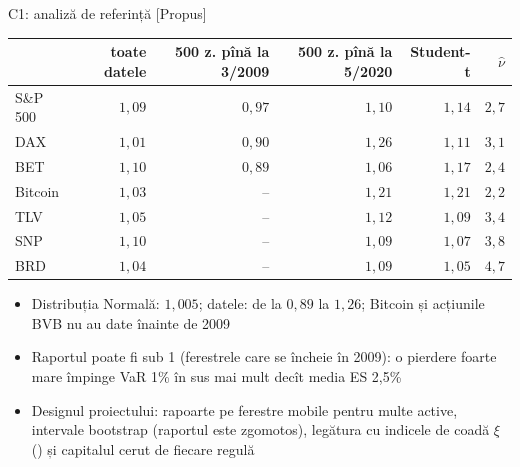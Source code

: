 \ifsolutions
\begin{frame}{C1: analiză de referință [Propus]}
\itemsize{\footnotesize}
\begin{center}
\scriptsize
\begin{tabular}{lrrrrr}
\toprule
& toate datele & 500 z. pînă la 3/2009 & 500 z. pînă la 5/2020 & Student-t & $\hat\nu$ \\
\midrule
S\&P 500 & $1{,}09$ & $0{,}97$ & $1{,}10$ & $1{,}14$ & $2{,}7$ \\
DAX & $1{,}01$ & $0{,}90$ & $1{,}26$ & $1{,}11$ & $3{,}1$ \\
BET & $1{,}10$ & $0{,}89$ & $1{,}06$ & $1{,}17$ & $2{,}4$ \\
Bitcoin & $1{,}03$ & -- & $1{,}21$ & $1{,}21$ & $2{,}2$ \\
TLV & $1{,}05$ & -- & $1{,}12$ & $1{,}09$ & $3{,}4$ \\
SNP & $1{,}10$ & -- & $1{,}09$ & $1{,}07$ & $3{,}8$ \\
BRD & $1{,}04$ & -- & $1{,}09$ & $1{,}05$ & $4{,}7$ \\
\bottomrule
\end{tabular}
\end{center}
\begin{itemize}
    \item Distribuția Normală: $1{,}005$; datele: de la $0{,}89$ la $1{,}26$; Bitcoin și acțiunile BVB nu au date înainte de 2009
    \item Raportul poate fi sub 1 (ferestrele care se încheie în 2009): o pierdere foarte mare împinge VaR 1\% în sus mai mult decît media ES 2,5\%
    \item Designul proiectului: rapoarte pe ferestre mobile pentru multe active, intervale bootstrap (raportul este zgomotos), legătura cu indicele de coadă $\xi$ () și capitalul cerut de fiecare regulă
\end{itemize}
\end{frame}
\fi

